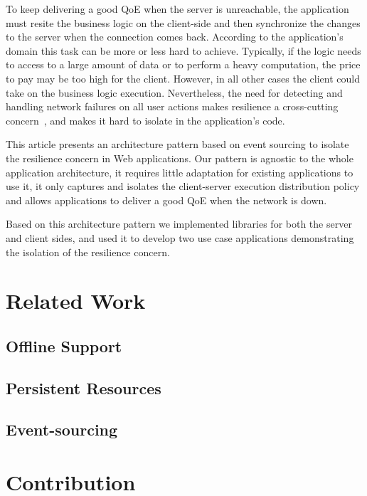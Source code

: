 \documentclass{article}
\begin{document}
To keep delivering a good QoE when the server is unreachable, the application must resite the business logic on the client-side and then synchronize the changes to the server when the connection comes back. According to the application's domain this task can be more or less hard to achieve. Typically, if the logic needs to access to a large amount of data or to perform a heavy computation, the price to pay may be too high for the client. However, in all other cases the client could take on the business logic execution. Nevertheless, the need for detecting and handling network failures on all user actions makes resilience a cross-cutting concern~\cite{Kiczales97_AOP}, and makes it hard to isolate in the application's code.

This article presents an architecture pattern based on event sourcing to isolate the resilience concern in Web applications. Our pattern is agnostic to the whole application architecture, it requires little adaptation for existing applications to use it, it only captures and isolates the client-server execution distribution policy and allows applications to deliver a good QoE when the network is down.

Based on this architecture pattern we implemented libraries for both the server and client sides, and used it to develop two use case applications demonstrating the isolation of the resilience concern.

\section{Related Work}

\subsection{Offline Support}

\subsection{Persistent Resources}

\subsection{Event-sourcing}

\section{Contribution}
\end{document}
